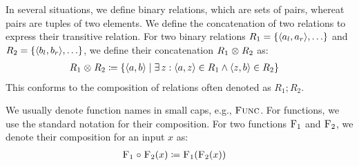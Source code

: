 In several situations, we define binary relations, which are sets of pairs, whereat pairs are tuples of two elements.
We define the concatenation of two relations to express their transitive relation.
For two binary relations $R_1 = \setted{\tupled{a_{l}, a_{r}}, \dots}$ and $R_2 = \setted{\tupled{b_{l}, b_{r}}, \dots}$, we define their concatenation $R_1 \mathrel{\otimes} R_2$ as:
\begin{align*}
    &
    R_1 \concat R_2 \equalsperdefinition \setted{\tupled{a,b} \mid \exists z : \tupled{a,z} \in R_1 \land \tupled{z,b} \in R_2}
\end{align*}
This conforms to the composition of relations often denoted as $R_1 ; R_2$.

We usually denote function names in small caps, e.g., $\textsc{Func}$.
For functions, we use the standard notation for their composition. For two functions $\textsc{F}_{1}$ and $\textsc{F}_{2}$, we denote their composition for an input $x$ as:
\begin{align*}
    &
    \textsc{F}_{1} \mathrel{\circ} \textsc{F}_{2}(x) \coloneqq \textsc{F}_{1}(\textsc{F}_{2}(x))
\end{align*}






